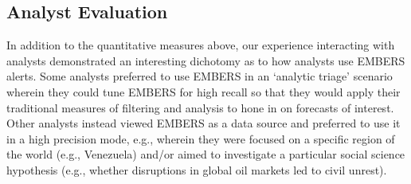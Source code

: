 \subsection{Analyst Evaluation}
In addition to the quantitative measures above, our experience interacting with analysts 
demonstrated
an interesting dichotomy as to how analysts use EMBERS alerts. Some analysts preferred to use EMBERS in an
`analytic triage' scenario wherein they could tune EMBERS for high recall so that they would apply their
traditional measures of filtering and analysis to hone in on forecasts of interest. Other analysts
instead viewed EMBERS as a data source and preferred to use it in a high precision mode, e.g., wherein they
were focused on a specific region of the world (e.g., Venezuela) and/or aimed to investigate a particular
social science hypothesis (e.g., whether disruptions in global oil markets led to civil unrest).

